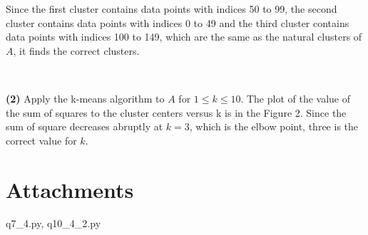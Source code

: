 \documentclass[a4paper, 11pt]{article}
\begin{document}
Since the first cluster contains data points with indices 50 to 99, the second cluster contains data points with indices 0 to 49 and the third cluster contains data points with indices 100 to 149, which are the same as the natural clusters of $A$, it finds the correct clusters.

\

\textbf{(2)} Apply the k-means algorithm to $A$ for $1 \leq k \leq 10$. The plot of the value of the sum of squares to the cluster centers versus k is in the Figure 2. Since the sum of square decreases abruptly at $k=3$, which is the elbow point, three is the correct value for $k$.


\section*{Attachments}

q7\_4.py, q10\_4\_2.py
\end{document}
